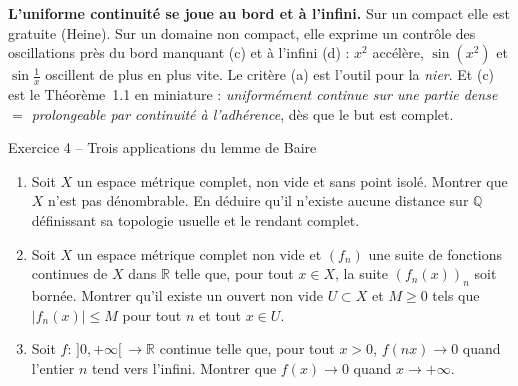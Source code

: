 \documentclass[11pt,a4paper]{article}
\newcommand{\R}{\mathbb{R}}
\newcommand{\Q}{\mathbb{Q}}
\theoremstyle{definition}
\begin{document}
\begin{pointcle}
\textbf{L'uniforme continuité se joue au bord et à l'infini.} Sur un compact elle est gratuite (Heine). Sur un domaine non compact, elle exprime un contrôle des oscillations près du bord manquant (c) et à l'infini (d) : $x^2$ accélère, $\sin(x^2)$ et $\sin\frac1x$ oscillent de plus en plus vite. Le critère (a) est l'outil pour la \emph{nier}. Et (c) est le Théorème~1.1 en miniature : \emph{uniformément continue sur une partie dense $=$ prolongeable par continuité à l'adhérence}, dès que le but est complet.
\end{pointcle}

\begin{exo}{Exercice 4 -- Trois applications du lemme de Baire}
\begin{enumerate}[label=(\alph*)]
  \item Soit $X$ un espace métrique complet, non vide et sans point isolé. Montrer que $X$ n'est pas dénombrable. En déduire qu'il n'existe aucune distance sur $\Q$ définissant sa topologie usuelle et le rendant complet.
  \item Soit $X$ un espace métrique complet non vide et $(f_n)$ une suite de fonctions continues de $X$ dans $\R$ telle que, pour tout $x\in X$, la suite $(f_n(x))_n$ soit bornée. Montrer qu'il existe un ouvert non vide $U\subset X$ et $M\ge0$ tels que $|f_n(x)|\le M$ pour tout $n$ et tout $x\in U$.
  \item Soit $f:\,]0,+\infty[\,\to\R$ continue telle que, pour tout $x>0$, $f(nx)\to0$ quand l'entier $n$ tend vers l'infini. Montrer que $f(x)\to0$ quand $x\to+\infty$.
\end{enumerate}
\end{exo}
\end{document}

